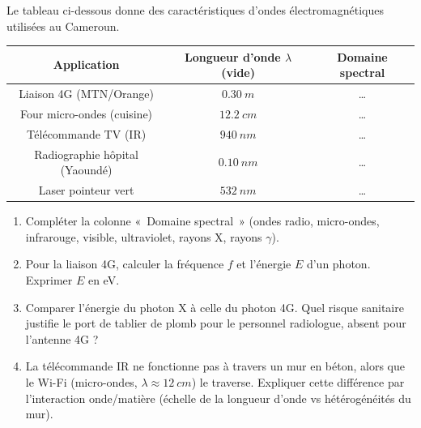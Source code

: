 \documentclass[11pt]{article}
\begin{document}
\begin{exercice}
Le tableau ci-dessous donne des caractéristiques d'ondes électromagnétiques utilisées au Cameroun.
\begin{center}
\begin{tabular}{|c|c|c|}
\hline
\textbf{Application} & \textbf{Longueur d'onde $\lambda$ (vide)} & \textbf{Domaine spectral} \\
\hline
Liaison 4G (MTN/Orange) & $\SI{0,30}{m}$ & \ldots \\
\hline
Four micro-ondes (cuisine) & $\SI{12,2}{cm}$ & \ldots \\
\hline
Télécommande TV (IR) & $\SI{940}{nm}$ & \ldots \\
\hline
Radiographie hôpital (Yaoundé) & $\SI{0,10}{nm}$ & \ldots \\
\hline
Laser pointeur vert & $\SI{532}{nm}$ & \ldots \\
\hline
\end{tabular}
\end{center}
\begin{enumerate}
    \item Compléter la colonne «~Domaine spectral~» (ondes radio, micro-ondes, infrarouge, visible, ultraviolet, rayons X, rayons $\gamma$).
    \item Pour la liaison 4G, calculer la fréquence $f$ et l'énergie $E$ d'un photon. Exprimer $E$ en \si{eV}.
    \item Comparer l'énergie du photon X à celle du photon 4G. Quel risque sanitaire justifie le port de tablier de plomb pour le personnel radiologue, absent pour l'antenne 4G ?
    \item La télécommande IR ne fonctionne pas à travers un mur en béton, alors que le Wi-Fi (micro-ondes, $\lambda \approx \SI{12}{cm}$) le traverse. Expliquer cette différence par l'interaction onde/matière (échelle de la longueur d'onde vs hétérogénéités du mur).
\end{enumerate}
\end{exercice}
\end{document}
